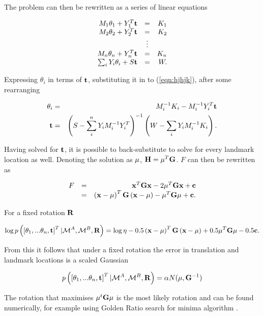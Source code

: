 The problem can then be rewritten as a series of linear equations

\begin{equation}
\begin{array}{rcr}
M_1\theta_1 + Y_1^T{\bf t} &=& K_1\\
M_2\theta_2 + Y_2^T{\bf t} &=& K_2\\
&\vdots&\\
M_n\theta_n + Y_n^T{\bf t} &=& K_n\\
\sum_i Y_i\theta_i + S{\bf t} &=& W.
\end{array}
\label{eqn:hjhjk}
\end{equation}

Expressing $\theta_i$ in terms of ${\bf t}$, substituting it in to
(\ref{eqn:hjhjk}), after some rearranging 

\begin{eqnarray}
\theta_i &=& M_i^{-1}K_i - M_i^{-1}Y_i^T{\bf t}\\
{\bf t} &=& \left( S -\sum_i^n Y_iM_i^{-1}Y_i^T \right)^{-1}
\left(W - \sum_i Y_iM_i^{-1}K_i \right).
\end{eqnarray}

Having solved for ${\bf t}$, it is possible to back-substitute to
solve for every landmark location as well. Denoting the solution as
${\bf \mu}$, ${\bf H}={\bf \mu}^T{\bf G}$. $F$ can then be rewritten
as

\begin{equation}
\begin{array}{rcr}
F &=& {\bf x}^T{\bf Gx} - 2{\bf \mu}^T{\bf Gx} + {\bf c}\\
 &=& \left({\bf x - \mu}\right)^T{\bf G}\left( {\bf x - \mu} \right) -
{\bf \mu}^T{\bf G\mu} + {\bf c}.
\end{array}
\end{equation}

For a fixed rotation ${\bf R}$ 

$$
\log p\left(\left[\theta_1, ...\theta_n,{\bf t} \right]^T | 
\mapA, \mapB,{\bf R} \right) =
\log \eta -0.5\left({\bf x - \mu}\right)^T{\bf G}\left( {\bf x - \mu} \right) +
0.5{\bf \mu}^T{\bf G\mu} -0.5 {\bf c}.
$$

From this it follows that under a fixed rotation the error in
translation and landmark locations is a scaled Gaussian

$$
p\left(\left[\theta_1, ...\theta_n,{\bf t}\right]^T | 
\mapA,\mapB,{\bf R}\right) 
= \alpha N({\bf \mu}, {\bf G}^{-1})
$$

The rotation that maximises $\mu^t{\bf G}\mu$ is the most likely
rotation and can be found numerically, for example using Golden Ratio
search for minima algorithm \cite{Pres92}.

